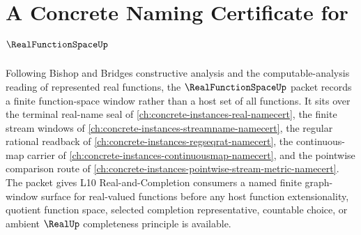 \chapter{A Concrete Naming Certificate for $\RealFunctionSpaceUp$}
\label{ch:concrete-instances-real-function-space-namecert}

Following Bishop and Bridges constructive analysis and the computable-analysis reading of represented real functions, the $\RealFunctionSpaceUp$ packet records a finite function-space window rather than a host set of all functions. It sits over the terminal real-name seal of \autoref{ch:concrete-instances-real-namecert}, the finite stream windows of \autoref{ch:concrete-instances-streamname-namecert}, the regular rational readback of \autoref{ch:concrete-instances-regseqrat-namecert}, the continuous-map carrier of \autoref{ch:concrete-instances-continuousmap-namecert}, and the pointwise comparison route of \autoref{ch:concrete-instances-pointwise-stream-metric-namecert}. The packet gives L10 Real-and-Completion consumers a named finite graph-window surface for real-valued functions before any host function extensionality, quotient function space, selected completion representative, countable choice, or ambient $\RealUp$ completeness principle is available.

